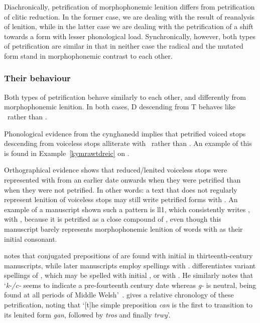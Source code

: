 Diachronically, petrification of morphophonemic lenition differs from petrification of clitic reduction. 
In the former case, we are dealing with the result of reanalysis of lenition, while in the latter case we are dealing with the petrification of a shift towards a form with lesser phonological load. 
Synchronically, however, both types of petrification are similar in that in neither case the radical and the mutated form stand in morphophonemic contrast to each other. 

\subsubsection{Their behaviour}
\label{sec:their-behaviour}
Both types of petrification behave similarly to each other, and differently from morphophonemic lenition. 
In both cases, \gls{D} descending from \gls{T} behaves like \xD\ rather than \lT.

Phonological evidence from the cynghanedd implies that petrified voiced stops descending from voiceless stops alliterate with \xD\ rather than \lT. An example of this is found in Example~\ref{kymrawtdreic} on . 

Orthographical evidence shows that reduced/lenited voiceless stops were represented with  from an earlier date onwards when they were petrified than when they were not petrified. 
In other words: a text that does not regularly represent lenition of voiceless stops may still write petrified forms with . 
An example of a manuscript shown such a pattern is \gls{ll1}, which consistently writes , with , because it is petrified as a close compound of , even though this manuscript barely represents morphophonemic lenition of words with  as their initial consonant.

\Textcite[52]{jongeleen_lenition_2016} notes that conjugated prepositions of  are found with initial   in thirteenth-century manuscripts, while later manuscripts employ spellings with .
\Textcite{sims-williams_variation_2013} differentiates variant spellings of , which may be spelled with initial , or with .
He similarly notes that `\textit{k-/c-} seems to indicate a pre-fourteenth century date whereas \textit{g-} is neutral, being found at all periods of Middle Welsh'~\autocite[24]{sims-williams_variation_2013}. \Textcite[55]{jongeleen_lenition_2016} gives a relative chronology of these petrification, noting that `[t]he simple preposition \textit{can} is the first to transition to its lenited form \textit{gan}, followed by \textit{tros} and finally \textit{trwy}'.



